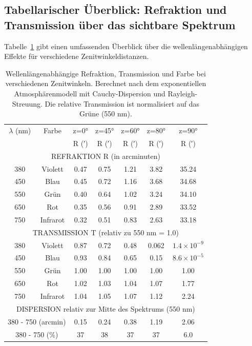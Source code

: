 \documentclass[12pt,a4paper]{article}
\begin{document}
\subsection{Tabellarischer Überblick: Refraktion und Transmission über das sichtbare Spektrum}
\label{subsec:comprehensive_table}

Tabelle~\ref{tab:dispersion_comprehensive} gibt einen umfassenden Überblick über
die wellenlängenabhängigen Effekte für verschiedene Zenitwinkeldistanzen.

\begin{table}[ht]
	\centering
	\caption{Wellenlängenabhängige Refraktion, Transmission und Farbe bei verschiedenen Zenitwinkeln.
	         Berechnet nach dem exponentiellen Atmosphärenmodell mit Cauchy-Dispersion und
	         Rayleigh-Streuung. Die relative Transmission ist normalisiert auf das Grüne (550 nm).}
	\label{tab:dispersion_comprehensive}
	\begin{tabular}{ccccccc}
		\toprule
		$\lambda$ (nm) & Farbe & z=0° & z=45° & z=60° & z=80° & z=90° \\
		& & R (′) & R (′) & R (′) & R (′) & R (′) \\
		\midrule
		\multicolumn{7}{c}{REFRAKTION R (in arcminuten)} \\
		\midrule
		380 & Violett & 0.47 & 0.75 & 1.21 & 3.82 & 35.24 \\
		450 & Blau & 0.45 & 0.72 & 1.16 & 3.68 & 34.68 \\
		550 & Grün & 0.40 & 0.64 & 1.02 & 3.24 & 34.10 \\
		650 & Rot & 0.35 & 0.56 & 0.91 & 2.89 & 33.52 \\
		750 & Infrarot & 0.32 & 0.51 & 0.83 & 2.63 & 33.18 \\
		\midrule
		\multicolumn{7}{c}{TRANSMISSION T (relativ zu 550 nm = 1.0)} \\
		\midrule
		380 & Violett & 0.87 & 0.72 & 0.48 & 0.062 & $1.4 \times 10^{-9}$ \\
		450 & Blau & 0.93 & 0.84 & 0.65 & 0.15 & $8.6 \times 10^{-5}$ \\
		550 & Grün & 1.00 & 1.00 & 1.00 & 1.00 & 1.00 \\
		650 & Rot & 1.02 & 1.03 & 1.04 & 1.07 & 1.77 \\
		750 & Infrarot & 1.04 & 1.05 & 1.07 & 1.12 & 2.24 \\
		\midrule
		\multicolumn{7}{c}{DISPERSION relativ zur Mitte des Spektrums (550 nm)} \\
		\midrule
		\multicolumn{2}{c}{380 - 750 (arcmin)} & 0.15 & 0.24 & 0.38 & 1.19 & 2.06 \\
		\multicolumn{2}{c}{380 - 750 (\%)} & 37 & 38 & 37 & 37 & 6.0 \\
		\bottomrule
	\end{tabular}
\end{table}
\end{document}
